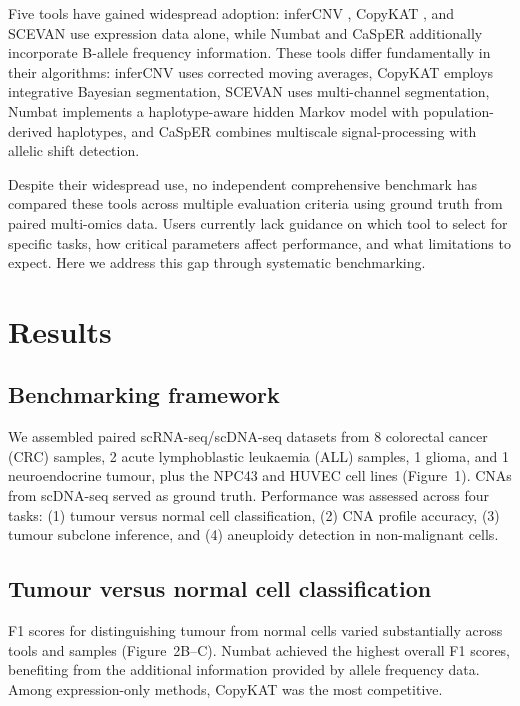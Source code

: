 \documentclass[11pt]{article}
\begin{document}
Five tools have gained widespread adoption: inferCNV \citep{tickle2019infercnv}, CopyKAT \citep{gao2021delineating}, and SCEVAN \citep{devecchi2022scevan} use expression data alone, while Numbat \citep{gao2023haplotype} and CaSpER \citep{serin2021casper} additionally incorporate B-allele frequency information. These tools differ fundamentally in their algorithms: inferCNV uses corrected moving averages, CopyKAT employs integrative Bayesian segmentation, SCEVAN uses multi-channel segmentation, Numbat implements a haplotype-aware hidden Markov model with population-derived haplotypes, and CaSpER combines multiscale signal-processing with allelic shift detection.

Despite their widespread use, no independent comprehensive benchmark has compared these tools across multiple evaluation criteria using ground truth from paired multi-omics data. Users currently lack guidance on which tool to select for specific tasks, how critical parameters affect performance, and what limitations to expect. Here we address this gap through systematic benchmarking.

\section{Results}

\subsection{Benchmarking framework}

We assembled paired scRNA-seq/scDNA-seq datasets from 8 colorectal cancer (CRC) samples, 2 acute lymphoblastic leukaemia (ALL) samples, 1 glioma, and 1 neuroendocrine tumour, plus the NPC43 and HUVEC cell lines (Figure~1). CNAs from scDNA-seq served as ground truth. Performance was assessed across four tasks: (1) tumour versus normal cell classification, (2) CNA profile accuracy, (3) tumour subclone inference, and (4) aneuploidy detection in non-malignant cells.

\subsection{Tumour versus normal cell classification}

F1 scores for distinguishing tumour from normal cells varied substantially across tools and samples (Figure~2B--C). Numbat achieved the highest overall F1 scores, benefiting from the additional information provided by allele frequency data. Among expression-only methods, CopyKAT was the most competitive.
\end{document}
